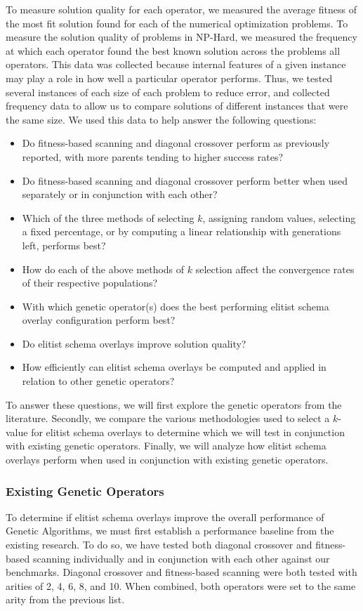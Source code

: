 To measure solution quality for each operator, we measured the average fitness of the most fit solution found for each of the numerical optimization problems. To measure the solution quality of problems in NP-Hard, we measured the frequency at which each operator found the best known solution across the problems all operators. This data was collected because internal features of a given instance may play a role in how well a particular operator performs. Thus, we tested several instances of each size of each problem to reduce error, and collected frequency data to allow us to compare solutions of different instances that were the same size. We used this data to help answer the following questions:

\begin{itemize}
\item Do fitness-based scanning and diagonal crossover perform as previously reported, with more parents tending to higher success rates?
\item Do fitness-based scanning and diagonal crossover perform better when used separately or in conjunction with each other? 
\item Which of the three methods of selecting $k$, assigning random values, selecting a fixed percentage, or by computing a linear relationship with generations left, performs best?
\item How do each of the above methods of $k$ selection affect the convergence rates of their respective populations?
\item With which genetic operator(s) does the best performing elitist schema overlay configuration perform best?
\item Do elitist schema overlays improve solution quality?
\item How efficiently can elitist schema overlays be computed and applied in relation to other genetic operators?
\end{itemize}

To answer these questions, we will first explore the genetic operators from the literature. Secondly, we compare the various methodologies used to select a $k$-value for elitist schema overlays to determine which we will test in conjunction with existing genetic operators. Finally, we will analyze how elitist schema overlays perform when used in conjunction with existing genetic operators.

\subsubsection*{Existing Genetic Operators}
To determine if elitist schema overlays improve the overall performance of Genetic Algorithms, we must first establish a performance baseline from the existing research. To do so, we have tested both diagonal crossover and fitness-based scanning individually and in conjunction with each other against our benchmarks. Diagonal crossover and fitness-based scanning were both tested with arities of 2, 4, 6, 8, and 10. When combined, both operators were set to the same arity from the previous list. 

